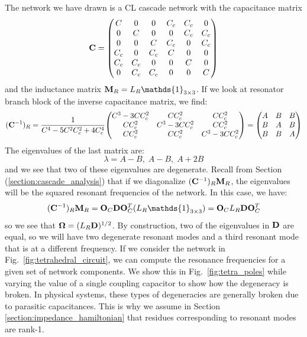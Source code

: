 The network we have drawn is a CL cascade network with the capacitance matrix
\begin{equation}
    \vb{C} = \mqty(
        C & 0 & 0 & C_c & C_c & 0\\
        0 & C & 0 & 0 & C_c & C_c \\
        0 & 0 & C & C_c & 0 & C_c \\
        C_c & 0 & C_c & C & 0 & 0 \\
        C_c & C_c & 0 & 0 & C & 0 \\
        0 & C_c & C_c & 0 & 0 & C
    )
\end{equation}
and the inductance matrix $\vb{M}_R=L_R \mathds{1}_{3 \times 3}$. If we look at resonator branch block of the inverse capacitance matrix, we find:
\begin{equation}
    (\vb{C}^{-1})_R = \frac{1}{C^4 - 5C^2C_c^2 + 4C_c^4}\mqty(
        C^3 - 3CC_c^2 & CC_c^2 & CC_c^2\\
        CC_c^2 & C^3 - 3CC_c^2 & CC_c^2 \\
        CC_c^2 & CC_c^2 & C^3 - 3CC_c^2
    ) = \mqty(A & B & B \\ B & A & B \\ B & B & A)
\end{equation}
The eigenvalues of the last matrix are:
\begin{equation}
    \lambda = A - B,\; A - B,\; A + 2B
\end{equation}
and we see that two of these eigenvalues are degenerate. Recall from Section (\ref{section:cascade_analysis}) that if we diagonalize $(\vb{C}^{-1})_R\vb{M}_R$, the eigenvalues will be the squared resonant frequencies of the network. In this case, we have:
\begin{equation}
    (\vb{C}^{-1})_R\vb{M}_R = \vb{O}_C \vb{D} \vb{O}_C^T (L_R \mathds{1}_{3\times 3}) = \vb{O}_C L_R \vb{D} \vb{O}_C^T
\end{equation}
so we see that $\vb{\Omega} = (L_R \vb{D})^{1/2}$. By construction, two of the eigenvalues in $\vb{D}$ are equal, so we will have two degenerate resonant modes and a third resonant mode that is at a different frequency. If we consider the network in Fig.\ \ref{fig:tetrahedral_circuit}, we can compute the resonance frequencies for a given set of network components. We show this in Fig.\ \ref{fig:tetra_poles} while varying the value of a single coupling capacitor to show how the degeneracy is broken. In physical systems, these types of degeneracies are generally broken due to parasitic capacitances. This is why we assume in Section \ref{section:impedance_hamiltonian} that residues corresponding to resonant modes are rank-1.

